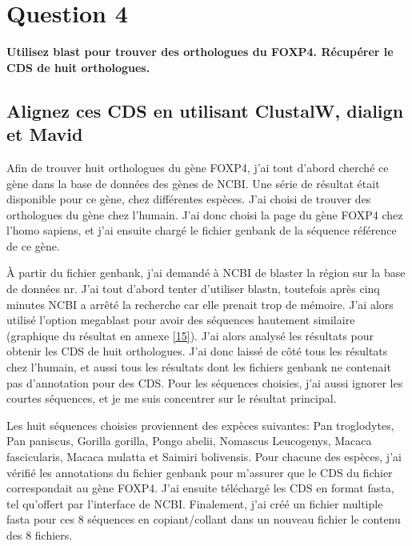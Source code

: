 \documentclass[10.8pt]{article} %
\begin{document}
 
\section{Question 4} %

{\bf Utilisez blast pour trouver des orthologues du FOXP4. Récupérer le CDS de huit orthologues.}

\subsection[Alignement multiple]{Alignez ces CDS en utilisant ClustalW, dialign et Mavid}

Afin de trouver huit orthologues du gène FOXP4, j'ai tout d'abord cherché ce gène dans la base de données des
gènes de NCBI. Une série de résultat était disponible pour ce gène, chez différentes espèces. J'ai choisi de
trouver des orthologues du gène chez l'humain. J'ai donc choisi la page du gène FOXP4 chez l'homo sapiens,
et j'ai ensuite chargé le fichier genbank de la séquence référence de ce gène.

À partir du fichier genbank, j'ai demandé à NCBI de blaster la région sur la base de données nr. J'ai tout
d'abord tenter d'utiliser blastn, toutefois après cinq minutes NCBI a arrêté la recherche car elle prenait
trop de mémoire. J'ai alors utilisé l'option megablast pour avoir des séquences hautement similaire
(graphique du résultat en annexe \ref{15}). J'ai alors analysé les résultats pour obtenir les CDS de huit 
orthologues. J'ai donc laissé de côté tous les résultats chez l'humain, et aussi tous les résultats dont
les fichiers genbank ne contenait pas d'annotation pour des CDS. Pour les séquences choisies, j'ai aussi
ignorer les courtes séquences, et je me suis concentrer sur le résultat principal.

Les huit séquences choisies proviennent des expèces suivantes: Pan troglodytes, Pan paniscus, Gorilla gorilla,
Pongo abelii, Nomascus Leucogenys, Macaca fascicularis, Macaca mulatta et Saimiri bolivensis. Pour chacune
des espèces, j'ai vérifié les annotations du fichier genbank pour m'assurer que le CDS du fichier correspondait
au gène FOXP4. J'ai ensuite téléchargé les CDS en format fasta, tel qu'offert par l'interface de NCBI.
Finalement, j'ai créé un fichier multiple fasta pour ces 8 séquences en copiant/collant dans un nouveau fichier
le contenu des 8 fichiers.
\end{document}
